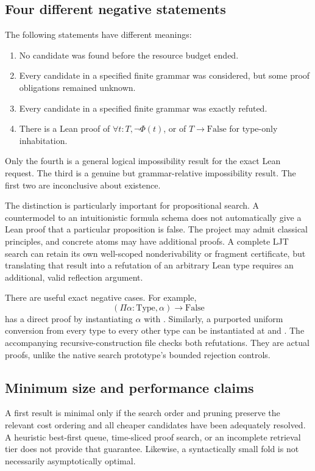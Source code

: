 \documentclass[11pt,letterpaper]{article}
\newcommand{\code}[1]{\texttt{\detokenize{#1}}}
\theoremstyle{definition}
\theoremstyle{remark}
\begin{document}
\subsection{Four different negative statements}

The following statements have different meanings:
\begin{enumerate}
\item No candidate was found before the resource budget ended.
\item Every candidate in a specified finite grammar was considered, but some proof obligations remained unknown.
\item Every candidate in a specified finite grammar was exactly refuted.
\item There is a Lean proof of $\forall t:T,\neg\Phi(t)$, or of $T\to\mathrm{False}$ for type-only inhabitation.
\end{enumerate}
Only the fourth is a general logical impossibility result for the exact Lean request. The third is a genuine but grammar-relative impossibility result. The first two are inconclusive about existence.

The distinction is particularly important for propositional search. A countermodel to an intuitionistic formula schema does not automatically give a Lean proof that a particular proposition is false. The project may admit classical principles, and concrete atoms may have additional proofs. A complete LJT search can retain its own well-scoped nonderivability or fragment certificate, but translating that result into a refutation of an arbitrary Lean type requires an additional, valid reflection argument.

There are useful exact negative cases. For example,
\[
 (\Pi\alpha:\mathrm{Type},\alpha)\to\mathrm{False}
\]
has a direct proof by instantiating $\alpha$ with \code{Empty}. Similarly, a purported uniform conversion from every type to every other type can be instantiated at \code{Unit} and \code{Empty}. The accompanying recursive-construction file checks both refutations. They are actual proofs, unlike the native search prototype's bounded rejection controls.

\subsection{Minimum size and performance claims}

A first result is minimal only if the search order and pruning preserve the relevant cost ordering and all cheaper candidates have been adequately resolved. A heuristic best-first queue, time-sliced proof search, or an incomplete retrieval tier does not provide that guarantee. Likewise, a syntactically small fold is not necessarily asymptotically optimal.
\end{document}
